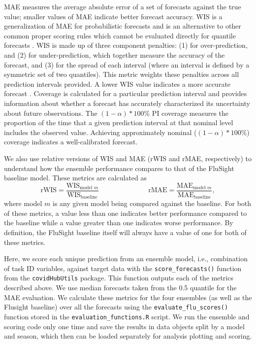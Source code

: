 \documentclass[
  article,
  shortnames,
  notitle]{jss}
\begin{document}
MAE measures the average absolute error of a set of forecasts against
the true value; smaller values of MAE indicate better forecast accuracy.
WIS is a generalization of MAE for probabilistic forecasts and is an
alternative to other common proper scoring rules which cannot be
evaluated directly for quantile forecasts
\citep{bracher_evaluating_2021}. WIS is made up of three component
penalties: (1) for over-prediction, and (2) for under-prediction, which
together measure the accuracy of the forecast, and (3) for the spread of
each interval (where an interval is defined by a symmetric set of two
quantiles). This metric weights these penalties across all prediction
intervals provided. A lower WIS value indicates a more accurate forecast
\citep{bracher_evaluating_2021}. Coverage is calculated for a particular
prediction interval and provides information about whether a forecast
has accurately characterized its uncertainty about future observations.
The \((1-\alpha)*100\)\% PI coverage measures the proportion of the time
that a given prediction interval at that nominal level includes the
observed value. Achieving approximately nominal (\((1-\alpha)*100\)\%)
coverage indicates a well-calibrated forecast.

We also use relative versions of WIS and MAE (rWIS and rMAE,
respectively) to understand how the ensemble performance compares to
that of the FluSight baseline model. These metrics are calculated as
\[\textrm{rWIS} = \frac{\textrm{WIS}_{\textrm{model }m}}{\textrm{WIS}_{\textrm{baseline}}} \hspace{3cm} \textrm{rMAE} = \frac{\textrm{MAE}_{\textrm{model }m}}{\textrm{MAE}_{\textrm{baseline}}},\]
where model \(m\) is any given model being compared against the
baseline. For both of these metrics, a value less than one indicates
better performance compared to the baseline while a value greater than
one indicates worse performance. By definition, the FluSight baseline
itself will always have a value of one for both of these metrics.

Here, we score each unique prediction from an ensemble model, i.e.,
combination of task ID variables, against target data with the
\texttt{score\_forecasts()} function from the \texttt{covidHubUtils}
package. This function outputs each of the metrics described above. We
use median forecasts taken from the 0.5 quantile for the MAE evaluation.
We calculate these metrics for the four ensembles (as well as the
Flusight baseline) over all the forecasts using the
\texttt{evaluate\_flu\_scores()} function stored in the
\texttt{evaluation\_functions.R} script. We run the ensemble and scoring
code only one time and save the results in data objects split by a model
and season, which then can be loaded separately for analysis plotting
and scoring.
\end{document}
